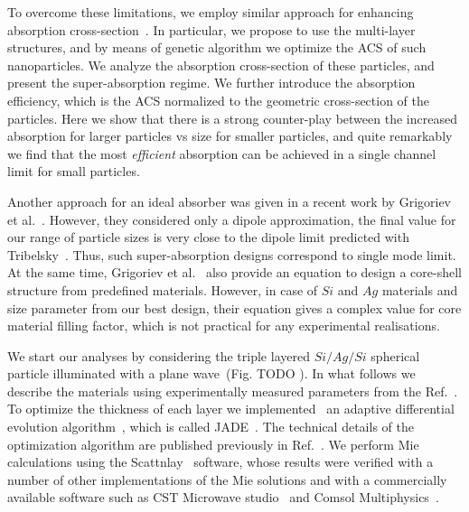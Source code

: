 \documentclass[aps,prl,twocolumn,showpacs,superscriptaddress,groupedaddress]{revtex4-1}
\begin{document}
To overcome these limitations, we employ similar approach for
enhancing absorption cross-section~\cite{Fan-2011}. In particular, we
propose to use the multi-layer structures, and by means of genetic
algorithm we optimize the ACS of such nanoparticles. We analyze the
absorption cross-section of these particles, and present the
super-absorption regime. We further introduce the absorption
efficiency, which is the ACS normalized to the geometric cross-section
of the particles. Here we show that there is a strong counter-play
between the increased absorption for larger particles vs size for
smaller particles, and quite remarkably we find that the most {\em
  efficient} absorption can be achieved in a single channel limit for
small particles.

Another approach for an ideal absorber was given in a recent work by
Grigoriev et al.~\cite{Grigoriev-2015}. However, they considered only
a dipole approximation, the final value for our range of particle
sizes is very close to the dipole limit predicted with
Tribelsky~\cite{Tribelsky-2011}.  Thus, such super-absorption designs
correspond to single mode limit.  At the same time, Grigoriev et
al.~\cite{Grigoriev-2015} also provide an equation to design a
core-shell structure from predefined materials. However, in case of
$Si$ and $Ag$ materials and size parameter from our best design, their
equation gives a complex value for core material filling factor, which
is not practical for any experimental realisations.


\begin{figure}
\end{figure}


We start our analyses by considering the triple layered $Si/Ag/Si$
spherical particle illuminated with a plane wave~(Fig. TODO ). In what
follows we describe the materials using experimentally measured
parameters from the Ref.~\cite{palik-1997}.  To optimize the thickness
of each layer we implemented~\cite{JADE-web} an adaptive differential
evolution algorithm~\cite{Storn-DE-first-1997}, which is called
JADE~\cite{Jingqiao-JADE-2009}.  The technical details of the
optimization algorithm are published previously in
Ref.~\cite{Ladutenko-2014}. We perform Mie calculations using the
Scattnlay~\cite{Pena-scattnlay-2009,Scattnlay-web} software, whose
results were verified with a number of other implementations of the
Mie solutions and with a commercially available software such as CST
Microwave studio~\cite{CST-web} and Comsol
Multiphysics~\cite{Comsol-web}.
\end{document}

